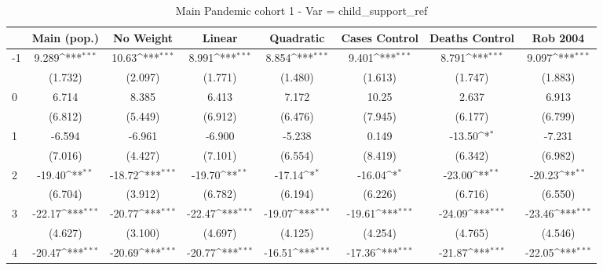 \documentclass{article}
\begin{document}
{
\def\sym#1{\ifmmode^{#1}\else\(^{#1}\)\fi}
\begin{longtable}{l*{7}{c}}
\caption{Main Pandemic cohort 1 - Var = child\_support\_ref}\\
\hline\hline\endfirsthead\hline\endhead\hline\endfoot\endlastfoot
                &\multicolumn{1}{c}{Main (pop.)}&\multicolumn{1}{c}{No Weight}&\multicolumn{1}{c}{Linear}&\multicolumn{1}{c}{Quadratic}&\multicolumn{1}{c}{Cases Control}&\multicolumn{1}{c}{Deaths Control}&\multicolumn{1}{c}{Rob 2004}\\
\hline
-1              &    9.289\sym{***}&    10.63\sym{***}&    8.991\sym{***}&    8.854\sym{***}&    9.401\sym{***}&    8.791\sym{***}&    9.097\sym{***}\\
                &  (1.732)         &  (2.097)         &  (1.771)         &  (1.480)         &  (1.613)         &  (1.747)         &  (1.883)         \\
0               &    6.714         &    8.385         &    6.413         &    7.172         &    10.25         &    2.637         &    6.913         \\
                &  (6.812)         &  (5.449)         &  (6.912)         &  (6.476)         &  (7.945)         &  (6.177)         &  (6.799)         \\
1               &   -6.594         &   -6.961         &   -6.900         &   -5.238         &    0.149         &   -13.50\sym{*}  &   -7.231         \\
                &  (7.016)         &  (4.427)         &  (7.101)         &  (6.554)         &  (8.419)         &  (6.342)         &  (6.982)         \\
2               &   -19.40\sym{**} &   -18.72\sym{***}&   -19.70\sym{**} &   -17.14\sym{*}  &   -16.04\sym{*}  &   -23.00\sym{**} &   -20.23\sym{**} \\
                &  (6.704)         &  (3.912)         &  (6.782)         &  (6.194)         &  (6.226)         &  (6.716)         &  (6.550)         \\
3               &   -22.17\sym{***}&   -20.77\sym{***}&   -22.47\sym{***}&   -19.07\sym{***}&   -19.61\sym{***}&   -24.09\sym{***}&   -23.46\sym{***}\\
                &  (4.627)         &  (3.100)         &  (4.697)         &  (4.125)         &  (4.254)         &  (4.765)         &  (4.546)         \\
4               &   -20.47\sym{***}&   -20.69\sym{***}&   -20.77\sym{***}&   -16.51\sym{***}&   -17.36\sym{***}&   -21.87\sym{***}&   -22.05\sym{***}\\

\end{longtable}}
\end{document}
